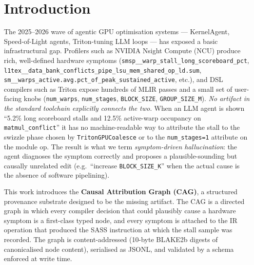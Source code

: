 \documentclass[10pt]{article}
\begin{document}
\section{Introduction}

The 2025--2026 wave of agentic GPU optimisation systems --- KernelAgent, Speed-of-Light agents, Triton-tuning LLM loops --- has exposed a basic infrastructural gap. Profilers such as NVIDIA Nsight Compute (NCU) produce rich, well-defined hardware symptoms (\texttt{smsp\_\_warp\_stall\_long\_scoreboard\_pct}, \texttt{l1tex\_\_data\_bank\_conflicts\_pipe\_lsu\_mem\_shared\_op\_ld.sum}, \texttt{sm\_\_warps\_active.avg.pct\_of\_peak\_sustained\_active}, etc.), and DSL compilers such as Triton expose hundreds of MLIR passes and a small set of user-facing knobs (\texttt{num\_warps}, \texttt{num\_stages}, \texttt{BLOCK\_SIZE}, \texttt{GROUP\_SIZE\_M}). \emph{No artifact in the standard toolchain explicitly connects the two.} When an LLM agent is shown ``5.2\% long scoreboard stalls and 12.5\% active-warp occupancy on \texttt{matmul\_conflict}'' it has no machine-readable way to attribute the stall to the swizzle phase chosen by \texttt{TritonGPUCoalesce} or to the \texttt{num\_stages=1} attribute on the module op. The result is what we term \emph{symptom-driven hallucination}: the agent diagnoses the symptom correctly and proposes a plausible-sounding but causally unrelated edit (e.g.~``increase \texttt{BLOCK\_SIZE\_K}'' when the actual cause is the absence of software pipelining).

This work introduces the \textbf{Causal Attribution Graph (CAG)}, a structured provenance substrate designed to be the missing artifact. The CAG is a directed graph in which every compiler decision that could plausibly cause a hardware symptom is a first-class typed node, and every symptom is attached to the IR operation that produced the SASS instruction at which the stall sample was recorded. The graph is content-addressed (10-byte BLAKE2b digests of canonicalised node content), serialised as JSONL, and validated by a schema enforced at write time.
\end{document}
